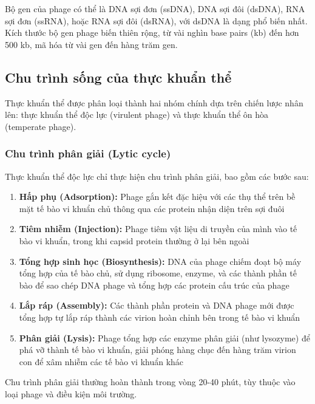 Bộ gen của phage có thể là DNA sợi đơn (ssDNA), DNA sợi đôi (dsDNA), RNA sợi đơn (ssRNA), hoặc RNA sợi đôi (dsRNA), với dsDNA là dạng phổ biến nhất. Kích thước bộ gen phage biến thiên rộng, từ vài nghìn base pairs (kb) đến hơn 500 kb, mã hóa từ vài gen đến hàng trăm gen.

\subsection{Chu trình sống của thực khuẩn thể}

Thực khuẩn thể được phân loại thành hai nhóm chính dựa trên chiến lược nhân lên: thực khuẩn thể độc lực (virulent phage) và thực khuẩn thể ôn hòa (temperate phage).

\subsubsection{Chu trình phân giải (Lytic cycle)}

Thực khuẩn thể độc lực chỉ thực hiện chu trình phân giải, bao gồm các bước sau:

\begin{enumerate}
    \item \textbf{Hấp phụ (Adsorption):} Phage gắn kết đặc hiệu với các thụ thể trên bề mặt tế bào vi khuẩn chủ thông qua các protein nhận diện trên sợi đuôi

    \item \textbf{Tiêm nhiễm (Injection):} Phage tiêm vật liệu di truyền của mình vào tế bào vi khuẩn, trong khi capsid protein thường ở lại bên ngoài

    \item \textbf{Tổng hợp sinh học (Biosynthesis):} DNA của phage chiếm đoạt bộ máy tổng hợp của tế bào chủ, sử dụng ribosome, enzyme, và các thành phần tế bào để sao chép DNA phage và tổng hợp các protein cấu trúc của phage

    \item \textbf{Lắp ráp (Assembly):} Các thành phần protein và DNA phage mới được tổng hợp tự lắp ráp thành các virion hoàn chỉnh bên trong tế bào vi khuẩn

    \item \textbf{Phân giải (Lysis):} Phage tổng hợp các enzyme phân giải (như lysozyme) để phá vỡ thành tế bào vi khuẩn, giải phóng hàng chục đến hàng trăm virion con để xâm nhiễm các tế bào vi khuẩn khác
\end{enumerate}

Chu trình phân giải thường hoàn thành trong vòng 20-40 phút, tùy thuộc vào loại phage và điều kiện môi trường.

